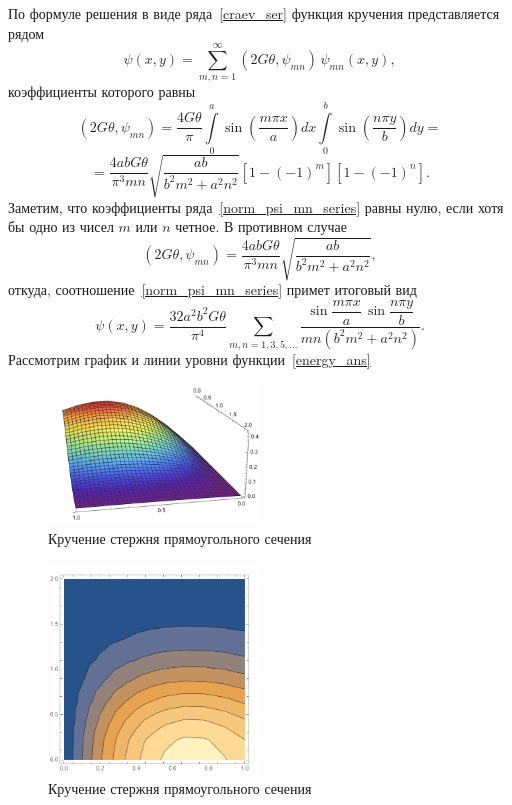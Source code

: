 \documentclass[12pt, a4paper]{article}
\begin{document}
По формуле решения в виде ряда~\eqref{craev_ser} функция кручения представляется рядом
\begin{equation}  \label{norm_psi_mn_series}
	\psi(x, y) = \sum_{m, n = 1}^\infty (2G \theta, \psi_{mn}) \, \psi_{mn}(x, y),
\end{equation}
коэффициенты которого равны
\[
(2G \theta, \psi_{mn}) = \frac{4 G \theta}{\pi}\int\limits_0^a \sin\left(\frac{m \pi x}{a}\right) dx \int\limits_0^b
\sin\left(\frac{n \pi y}{b}\right) dy = 
\]
\[
	= \frac{4abG\theta}{\pi^3 mn} \sqrt{\frac{ab}{b^2 m^2 + a^2 n^2}}[1 - (-1)^m][1 - (-1)^n].
\]
Заметим, что коэффициенты ряда~\eqref{norm_psi_mn_series} равны нулю, если
хотя бы одно из чисел $m$ или $n$ четное. В противном случае
\[
(2G \theta, \psi_{mn}) = \frac{4abG\theta}{\pi^3 mn} \sqrt{\frac{ab}{b^2 m^2 + a^2 n^2}},
\]
откуда, соотношение~\eqref{norm_psi_mn_series} примет итоговый вид
\begin{equation} 
	\label{energy_ans}
	\psi(x, y) = \frac{32 a^2 b^2 G\theta}{\pi^4} \!\!\! \sum_{m, n = 1, 3, 5, \ldots}
	\!\!\! \frac{\sin\dfrac{m\pi x}{a} \, \sin\dfrac{n\pi y}{b}}{mn(b^2 m^2 + a^2 n^2)}.
\end{equation}
Рассмотрим график и линии уровни функции~\eqref{energy_ans}
\begin{figure}[!h]
	\centering
	\includegraphics[width=0.5\textwidth]{ser_graph}%
	\caption{Кручение стержня прямоугольного сечения}
	\vspace*{-2mm}
	\label{pic1}
\end{figure}
\begin{figure}[!h]
	\centering
	\includegraphics[width=0.5\textwidth]{ser_levels}%
	\caption{Кручение стержня прямоугольного сечения}
	\vspace*{-2mm}
	\label{pic1}
\end{figure}
\end{document}
